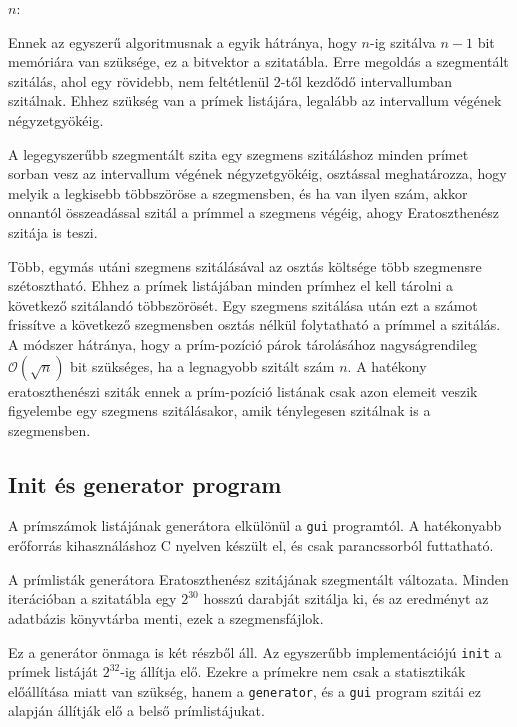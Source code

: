 \begin{algorithmic}[1]
\State $n$: 
\State {}
			\State {}
		\EndFor
	\EndIf
\EndFor
\end{algorithmic}

Ennek az egyszerű algoritmusnak a egyik hátránya, hogy $n$-ig szitálva $n-1$ bit memóriára van szüksége, ez a bitvektor a szitatábla.
Erre megoldás a szegmentált szitálás, ahol egy rövidebb, nem feltétlenül 2-től kezdődő intervallumban szitálnak.
Ehhez szükség van a prímek listájára, legalább az intervallum végének négyzetgyökéig.

A legegyszerűbb szegmentált szita egy szegmens szitáláshoz minden prímet sorban vesz az intervallum végének négyzetgyökéig, osztással meghatározza, hogy melyik a legkisebb többszöröse a szegmensben, és ha van ilyen szám, akkor onnantól összeadással szitál a prímmel a szegmens végéig, ahogy Eratoszthenész szitája is teszi.

Több, egymás utáni szegmens szitálásával az osztás költsége több szegmensre szétosztható.
Ehhez a prímek listájában minden prímhez el kell tárolni a következő szitálandó többszörösét.
Egy szegmens szitálása után ezt a számot frissítve a következő szegmensben osztás nélkül folytatható a prímmel a szitálás.
A módszer hátránya, hogy a prím-pozíció párok tárolásához nagyságrendileg $\mathcal{O}(\sqrt{n})$ bit szükséges, ha a legnagyobb szitált szám $n$.
A hatékony eratoszthenészi sziták ennek a prím-pozíció listának csak azon elemeit veszik figyelembe egy szegmens szitálásakor, amik ténylegesen szitálnak is a szegmensben.

\subsection{Init és generator program}

A prímszámok listájának generátora elkülönül a \texttt{gui} programtól.
A hatékonyabb erőforrás kihasználáshoz C nyelven készült el, és csak parancssorból futtatható.

A prímlisták generátora Eratoszthenész szitájának szegmentált változata.
Minden iterációban a szitatábla egy $2^{30}$ hosszú darabját szitálja ki,
és az eredményt az adatbázis könyvtárba menti, ezek a szegmensfájlok.

Ez a generátor önmaga is két részből áll.
Az egyszerűbb implementációjú \texttt{init} a prímek listáját $2^{32}$-ig állítja elő.
Ezekre a prímekre nem csak a statisztikák előállítása miatt van szükség, hanem a \texttt{generator}, és a \texttt{gui} program szitái ez alapján állítják elő a belső prímlistájukat.

